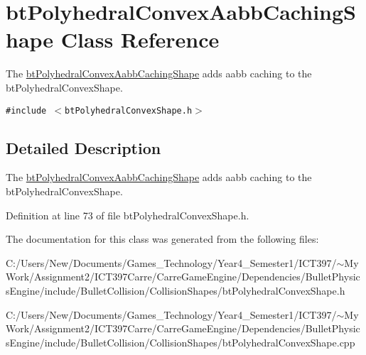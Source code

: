 \hypertarget{classbt_polyhedral_convex_aabb_caching_shape}{
\section{btPolyhedralConvexAabbCachingShape Class Reference}
\label{classbt_polyhedral_convex_aabb_caching_shape}
}
The \hyperlink{classbt_polyhedral_convex_aabb_caching_shape}{btPolyhedralConvexAabbCachingShape} adds aabb caching to the btPolyhedralConvexShape.  


{\tt \#include $<$btPolyhedralConvexShape.h$>$}



\subsection{Detailed Description}
The \hyperlink{classbt_polyhedral_convex_aabb_caching_shape}{btPolyhedralConvexAabbCachingShape} adds aabb caching to the btPolyhedralConvexShape. 

Definition at line 73 of file btPolyhedralConvexShape.h.

The documentation for this class was generated from the following files:\begin{CompactItemize}
\item 
C:/Users/New/Documents/Games\_\-Technology/Year4\_\-Semester1/ICT397/$\sim$My Work/Assignment2/ICT397Carre/CarreGameEngine/Dependencies/BulletPhysicsEngine/include/BulletCollision/CollisionShapes/btPolyhedralConvexShape.h\item 
C:/Users/New/Documents/Games\_\-Technology/Year4\_\-Semester1/ICT397/$\sim$My Work/Assignment2/ICT397Carre/CarreGameEngine/Dependencies/BulletPhysicsEngine/include/BulletCollision/CollisionShapes/btPolyhedralConvexShape.cpp\end{CompactItemize}
